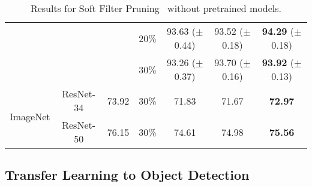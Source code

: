 \begin{table}[!htbp]
{\begin{tabular}{c|c|ccccc}
                           &                             & \multicolumn{1}{l}{} & 20\%        & 93.63 ($\pm$0.44) & 93.52 ($\pm$0.18) & \textbf{94.29} ($\pm$0.18) \\
                           &                             & \multicolumn{1}{l}{} & 30\%        & 93.26 ($\pm$0.37) & 93.70 ($\pm$0.16) & \textbf{93.92} ($\pm$0.13) \\ \hline
\multirow{2}{*}{ImageNet}  & ResNet-34                   & 73.92                & 30\%        & 71.83       & 71.67       & \textbf{72.97}       \\ \cline{2-7} 
                           & ResNet-50                   & 76.15                & 30\%        & 74.61       & 74.98       & \textbf{75.56}       \\ \hline
\end{tabular}
}
\caption{Results for Soft Filter Pruning~\cite{he2018sfp} without pretrained models.}
\label{sfp-1}
\end{table}

\setlength{\tabcolsep}{4pt}
\renewcommand{\arraystretch}{1.25}
\begin{table}[!htbp]
\centering
\small
{}
\caption{Results for Soft Filter Pruning~\cite{he2018sfp} using pretrained models.}
\label{sfp-2}
\end{table}




\subsection{Transfer Learning to Object Detection}
\label{sec:transfer}

